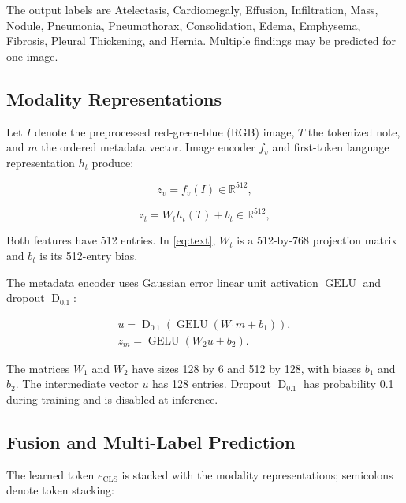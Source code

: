 \documentclass[conference,letterpaper]{IEEEtran}
\begin{document}
The output labels are Atelectasis, Cardiomegaly, Effusion, Infiltration, Mass, Nodule, Pneumonia, Pneumothorax, Consolidation, Edema, Emphysema, Fibrosis, Pleural Thickening, and Hernia. Multiple findings may be predicted for one image.


\subsection{Modality Representations}

Let $I$ denote the preprocessed red-green-blue (RGB) image, $T$ the tokenized note, and $m$ the ordered metadata vector. Image encoder ${f}_{v}$ and first-token language representation ${h}_{t}$ produce:

\begin{equation}{z}_{v}={f}_{v}\left(I\right)\in{\mathbb{R}}^{512},\label{eq:vision}\end{equation}

\begin{equation}{z}_{t}={W}_{t}{h}_{t}\left(T\right)+{b}_{t}\in{\mathbb{R}}^{512},\label{eq:text}\end{equation}

Both features have 512 entries. In \eqref{eq:text}, ${W}_{t}$ is a 512-by-768 projection matrix and ${b}_{t}$ is its 512-entry bias.

The metadata encoder uses Gaussian error linear unit activation $\operatorname{GELU}$ and dropout ${\operatorname{D}}_{0.1}$:

\begin{equation}\begin{gathered}u={\operatorname{D}}_{0.1}\left(\operatorname{GELU}\left({W}_{1}m+{b}_{1}\right)\right),\\{z}_{m}=\operatorname{GELU}\left({W}_{2}u+{b}_{2}\right).\end{gathered}\label{eq:metadata}\end{equation}

The matrices ${W}_{1}$ and ${W}_{2}$ have sizes 128 by 6 and 512 by 128, with biases ${b}_{1}$ and ${b}_{2}$. The intermediate vector $u$ has 128 entries. Dropout ${\operatorname{D}}_{0.1}$ has probability 0.1 during training and is disabled at inference.

\subsection{Fusion and Multi-Label Prediction}

The learned token ${e}_{\mathrm{CLS}}$ is stacked with the modality representations; semicolons denote token stacking:
\end{document}
